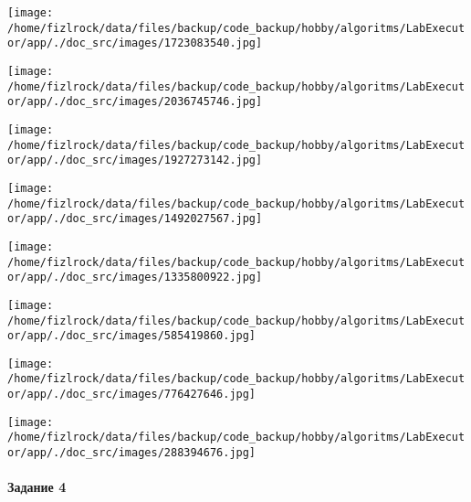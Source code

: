 \documentclass[a4paper, 12pt]{article}
\begin{document}
\texttt{[image: /home/fizlrock/data/files/backup/code\_backup/hobby/algoritms/LabExecutor/app/./doc\_src/images/1723083540.jpg]}

\texttt{[image: /home/fizlrock/data/files/backup/code\_backup/hobby/algoritms/LabExecutor/app/./doc\_src/images/2036745746.jpg]}

\texttt{[image: /home/fizlrock/data/files/backup/code\_backup/hobby/algoritms/LabExecutor/app/./doc\_src/images/1927273142.jpg]}

\texttt{[image: /home/fizlrock/data/files/backup/code\_backup/hobby/algoritms/LabExecutor/app/./doc\_src/images/1492027567.jpg]}

\texttt{[image: /home/fizlrock/data/files/backup/code\_backup/hobby/algoritms/LabExecutor/app/./doc\_src/images/1335800922.jpg]}

\texttt{[image: /home/fizlrock/data/files/backup/code\_backup/hobby/algoritms/LabExecutor/app/./doc\_src/images/585419860.jpg]}

\texttt{[image: /home/fizlrock/data/files/backup/code\_backup/hobby/algoritms/LabExecutor/app/./doc\_src/images/776427646.jpg]}

\texttt{[image: /home/fizlrock/data/files/backup/code\_backup/hobby/algoritms/LabExecutor/app/./doc\_src/images/288394676.jpg]}
\pagebreak
\paragraph{Задание 4}
\end{document}
